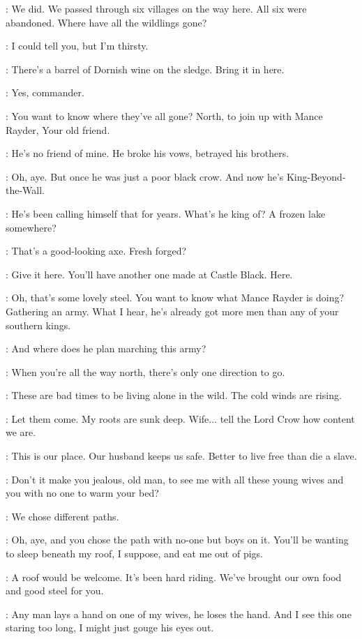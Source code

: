 \JEOR: We did. We passed through six villages on the way here. All six were abandoned. Where have all the wildlings gone?

\CRASTER: I could tell you, but I'm thirsty.

\JEOR: There's a barrel of Dornish wine on the sledge. Bring it in here.

\WATCHMANa: Yes, commander.

\CRASTER: You want to know where they've all gone? North, to join up with Mance Rayder, Your old friend.

\JEOR: He's no friend of mine. He broke his vows, betrayed his brothers.

\CRASTER: Oh, aye. But once he was just a poor black crow. And now he's King-Beyond-the-Wall.

\JEOR: He's been calling himself that for years. What's he king of? A frozen lake somewhere?

\CRASTER:  That's a good-looking axe. Fresh forged?

\JEOR: Give it here. You'll have another one made at Castle Black. Here.

\CRASTER: Oh, that's some lovely steel. You want to know what Mance Rayder is doing? Gathering an army. What I hear, he's already got more men than any of your southern kings.

\JEOR: And where does he plan marching this army?

\CRASTER: When you're all the way north, there's only one direction to go.

\JEOR: These are bad times to be living alone in the wild. The cold winds are rising.

\CRASTER: Let them come. My roots are sunk deep. Wife$\ldots$ tell the Lord Crow how content we are.

\GILLY: This is our place. Our husband keeps us safe. Better to live free than die a slave.

\CRASTER: Don't it make you jealous, old man, to see me with all these young wives and you with no one to warm your bed?

\JEOR: We chose different paths.

\CRASTER: Oh, aye, and you chose the path with no-one but boys on it. You'll be wanting to sleep beneath my roof, I suppose, and eat me out of pigs.

\JEOR: A roof would be welcome. It's been hard riding. We've brought our own food and good steel for you.

\CRASTER: Any man lays a hand on one of my wives, he loses the hand. And I see this one staring too long, I might just gouge his eyes out.

